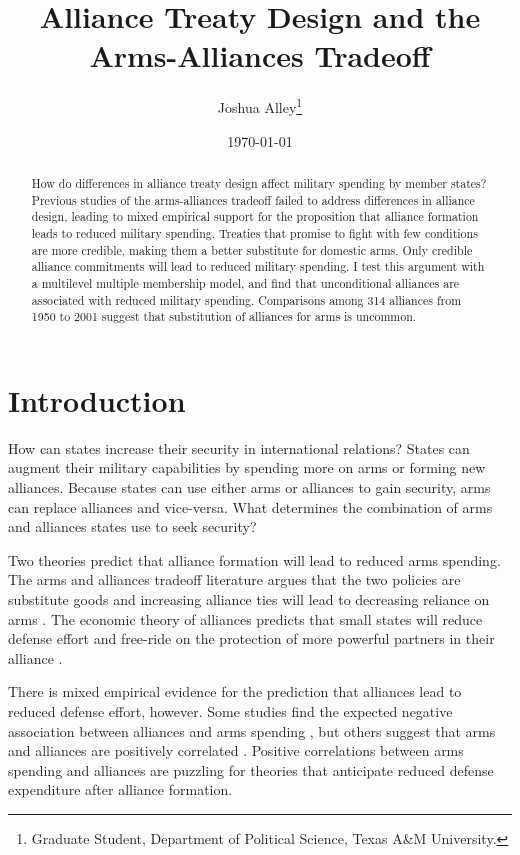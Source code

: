 \documentclass[12pt]{article}
\title{\textbf{Alliance Treaty Design and the Arms-Alliances Tradeoff}}
\author{Joshua Alley\footnote{Graduate Student,
Department of Political Science, Texas A\&M University.}}
\date{{\normalsize \today}}
\begin{document}
\maketitle 

\newpage 

\doublespace 

\begin{abstract}

How do differences in alliance treaty design affect military spending by member states? Previous studies of the arms-alliances tradeoff failed to address differences in alliance design, leading to mixed empirical support for the proposition that alliance formation leads to reduced military spending. Treaties that promise to fight with few conditions are more credible, making them a better substitute for domestic arms. Only credible alliance commitments will lead to reduced military spending. I test this argument with a multilevel multiple membership model, and find that unconditional alliances are associated with reduced military spending. Comparisons among 314 alliances from 1950 to 2001 suggest that substitution of alliances for arms is uncommon. 

\end{abstract}



\section*{Introduction}

How can states increase their security in international relations? States can augment their military capabilities by spending more on arms or forming new alliances. Because states can use either arms or alliances to gain security, arms can replace alliances and vice-versa. What determines the combination of arms and alliances states use to seek security?

Two theories predict that alliance formation will lead to reduced arms spending. The arms and alliances tradeoff literature argues that the two policies are substitute goods and increasing alliance ties will lead to decreasing reliance on arms \citep{Morrow1993, Sorokin1994, DigiuseppePoast2016}. The economic theory of alliances predicts that small states will reduce defense effort and free-ride on the protection of more powerful partners in their alliance \citep{OlsonZeckhauser1966, SandlerHartley2001}. 

There is mixed empirical evidence for the prediction that alliances lead to reduced defense effort, however. Some studies find the expected negative association between alliances and arms spending \citep{Conybeare1992, Morrow1993, Kimball2010, DigiuseppePoast2016}, but others suggest that arms and alliances are positively correlated \citep{Diehl1994, Horowitzetal2017, MorganPalmer2006}. Positive correlations between arms spending and alliances are puzzling for theories that anticipate reduced defense expenditure after alliance formation.
\end{document}
